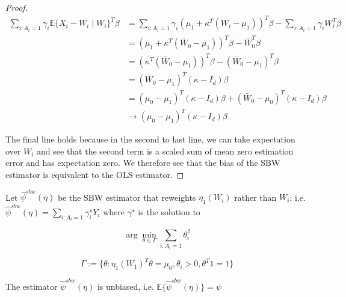 \begin{proof}
\begin{align*}
    \sum_{i: A_i = 1} \gamma_i\mathbb{E}\{X_i - W_i \mid W_i\}^T\beta &= \sum_{i: A_i = 1} \gamma_i (\mu_1 + \kappa^T(W_i - \mu_1))^T\beta - \sum_{i: A_i = 1}\gamma_i W_i^T\beta \\
    &= (\mu_1 + \kappa^T(\bar{W}_0 - \mu_1))^T\beta - \bar{W}_0^T\beta \\
    &= (\kappa^T(\bar{W}_0 - \mu_1))^T\beta - (\bar{W}_0 - \mu_1)^T\beta  \\
    &= (\bar{W}_0 - \mu_1)^T(\kappa - I_d)\beta \\
    &= (\mu_0 - \mu_1)^T(\kappa - I_d)\beta + (\bar{W}_0 - \mu_0)^T(\kappa - I_d)\beta \\
    &\to (\mu_0 - \mu_1)^T(\kappa - I_d)\beta
\end{align*}

The final line holds because in the second to last line, we can take expectation over $W_i$ and see that the second term is a scaled sum of mean zero estimation error and has expectation zero. We therefore see that the  bias of the SBW estimator is equivalent to the OLS estimator.
\end{proof}

Let $\hat{\psi}^{sbw}(\eta)$ be the SBW estimator that reweights $\eta_1(W_i)$ rather than $W_i$; i.e. $\hat{\psi}^{sbw}(\eta) = \sum_{i: A_i = 1}\gamma_i^\star Y_i$ where $\gamma^\star$ is the solution to

$$
\arg\min_{\theta \in \Gamma} \sum_{i: A_i = 1}\theta_i^2
$$

$$
\Gamma := \{\theta: \eta_1(W_1)^T\theta = \mu_0, \theta_i > 0, \theta^T1 = 1\}
$$

\begin{proposition}
The estimator $\hat{\psi}^{sbw}(\eta)$ is unbiased, i.e.
$\mathbb{E}\{\hat{\psi}^{sbw}(\eta)\} = \psi$
\end{proposition}

